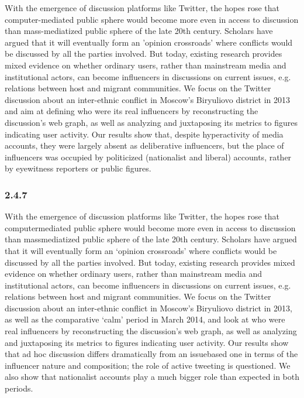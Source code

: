 With the emergence of discussion platforms like Twitter, the hopes rose that computer-mediated public sphere would become more even in access to discussion than mass-mediatized public sphere of the late 20th century. Scholars have argued that it will eventually form an 'opinion crossroads' where conflicts would be discussed by all the parties involved. But today, existing research provides mixed evidence on whether ordinary users, rather than mainstream media and institutional actors, can become influencers in discussions on current issues, e.g. relations between host and migrant communities. We focus on the Twitter discussion about an inter-ethnic conflict in Moscow's Biryuliovo district in 2013 and aim at defining who were its real influencers by reconstructing the discussion's web graph, as well as analyzing and juxtaposing its metrics to figures indicating user activity. Our results show that, despite hyperactivity of media accounts, they were largely absent as deliberative influencers, but the place of influencers was occupied by politicized (nationalist and liberal) accounts, rather by eyewitness reporters or public figures.

\subsubsection{2.4.7}

With the emergence of discussion platforms like Twitter, the hopes rose that computermediated public sphere would become more even in access to discussion than massmediatized public sphere of the late 20th century. Scholars have argued that it will eventually form an ‘opinion crossroads’ where conflicts would be discussed by all the parties involved. But today, existing research provides mixed evidence on whether ordinary users, rather than mainstream media and institutional actors, can become influencers in discussions on current issues, e.g. relations between host and migrant communities. We focus on the Twitter discussion about an inter-ethnic conflict in Moscow’s Biryuliovo district in 2013, as well as the comparative ‘calm’ period in March 2014, and look at who were real influencers by reconstructing the discussion’s web graph, as well as analyzing and juxtaposing its metrics to figures indicating user activity. Our results show that ad hoc discussion differs dramatically from an issuebased one in terms of the influencer nature and composition; the role of active tweeting is questioned. We also show that nationalist accounts play a much bigger role than expected in both periods.

